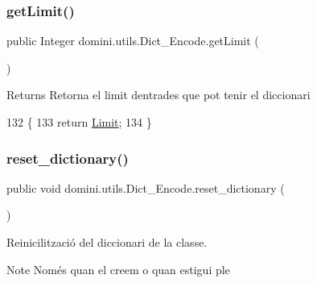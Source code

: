 \subsubsection{\texorpdfstring{get\+Limit()}{getLimit()}}
{\footnotesize\ttfamily public Integer domini.\+utils.\+Dict\+\_\+\+Encode.\+get\+Limit (\begin{DoxyParamCaption}{ }\end{DoxyParamCaption})\hspace{0.3cm}{\ttfamily [inline]}}

\begin{DoxyReturn}{Returns}
Retorna el limit d\textquotesingle{}entrades que pot tenir el diccionari 
\end{DoxyReturn}

\begin{DoxyCode}
132                               \{
133         \textcolor{keywordflow}{return} \hyperlink{classdomini_1_1utils_1_1Dict__Encode_a48fe9a878056a119ad36a0aad2727a13}{Limit};
134     \}
\end{DoxyCode}
\mbox{\label{classdomini_1_1utils_1_1Dict__Encode_a6c3016286b3bb242d12799f8e7ebb585}} 
\subsubsection{\texorpdfstring{reset\+\_\+dictionary()}{reset\_dictionary()}}
{\footnotesize\ttfamily public void domini.\+utils.\+Dict\+\_\+\+Encode.\+reset\+\_\+dictionary (\begin{DoxyParamCaption}{ }\end{DoxyParamCaption})\hspace{0.3cm}{\ttfamily [inline]}}



Reinicilització del diccionari de la classe. 

\begin{DoxyNote}{Note}
Només quan el creem o quan estigui ple 
\end{DoxyNote}


